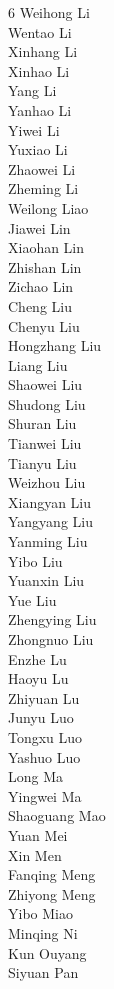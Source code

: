 \documentclass{article}
\begin{document}
\begin{multicols}{6}
{Weihong Li\\
Wentao Li\\
Xinhang Li\\
Xinhao Li\\
Yang Li\\
Yanhao Li\\
Yiwei Li\\
Yuxiao Li\\
Zhaowei Li\\
Zheming Li\\
Weilong Liao\\
Jiawei Lin\\
Xiaohan Lin\\
Zhishan Lin\\
Zichao Lin\\
Cheng Liu\\
Chenyu Liu\\
Hongzhang Liu\\
Liang Liu\\
Shaowei Liu\\
Shudong Liu\\
Shuran Liu\\
Tianwei Liu\\
Tianyu Liu\\
Weizhou Liu\\
Xiangyan Liu\\
Yangyang Liu\\
Yanming Liu\\
Yibo Liu\\
Yuanxin Liu\\
Yue Liu\\
Zhengying Liu\\
Zhongnuo Liu\\
Enzhe Lu\\
Haoyu Lu\\
Zhiyuan Lu\\
Junyu Luo\\
Tongxu Luo\\
Yashuo Luo\\
Long Ma\\
Yingwei Ma\\
Shaoguang Mao\\
Yuan Mei\\
Xin Men\\
Fanqing Meng\\
Zhiyong Meng\\
Yibo Miao\\
Minqing Ni\\
Kun Ouyang\\
Siyuan Pan\\
}
\end{multicols}
\end{document}
